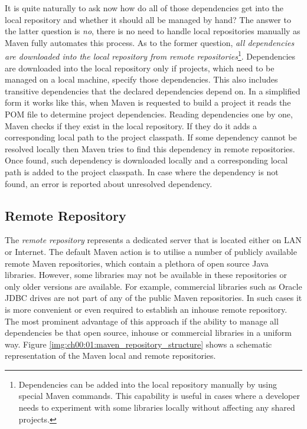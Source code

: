   It is quite naturally to ask now how do all of those dependencies get into the local repository and whether it should all be managed by hand?
  The answer to the latter question is \emph{no}, there is no need to handle local repositories manually as Maven fully automates this process.
  As to the former question, \emph{all dependencies are downloaded into the local repository from remote repositories}\footnote{
    Dependencies can be added into the local repository manually by using special Maven commands. 
    This capability is useful in cases where a developer needs to experiment with some libraries locally without affecting any shared projects.
  }.
  Dependencies are downloaded into the local repository only if projects, which need to be managed on a local machine, specify those dependencies.
  This also includes transitive dependencies that the declared dependencies depend on.
  In a simplified form it works like this, when Maven is requested to build a project it reads the POM file to determine project dependencies.
  Reading dependencies one by one, Maven checks if they exist in the local repository.
  If they do it adds a corresponding local path to the project classpath.
  If some dependency cannot be resolved locally then Maven tries to find this dependency in remote repositories.
  Once found, such dependency is downloaded locally and a corresponding local path is added to the project classpath.
  In case where the dependency is not found, an error is reported about unresolved dependency.

  \subsection*{Remote Repository}
  
  The \emph{remote repository} represents a dedicated server that is located either on LAN or Internet.
  The default Maven action is to utilise a number of publicly available remote Maven repositories, which contain a plethora of open source Java libraries.
  However, some libraries may not be available in these repositories or only older versions are available.
  For example, commercial libraries such as Oracle JDBC drives are not part of any of the public Maven repositories.
  In such cases it is more convenient or even required to establish an inhouse remote repository.
  The most prominent advantage of this approach if the ability to manage all dependencies be that open source, inhouse or commercial libraries in a uniform way.
  Figure \ref{img:ch00:01:maven_repository_structure} shows a schematic representation of the Maven local and remote repositories.

